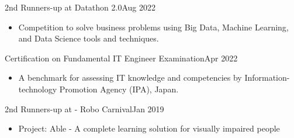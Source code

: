   \customSubHeadingContentStart
  
    \customSubHeading
      {2nd Runners-up at Datathon 2.0}{Aug 2022}
      \begin{itemize}[itemsep=-3pt, left=0pt]
        \item {Competition to solve business problems using Big Data, Machine Learning, and Data Science tools and techniques.}
    \end{itemize}
    \vspace{-10pt}
      
      
    \customSubHeading
      {Certification on Fundamental IT Engineer Examination}{Apr 2022}
     \begin{itemize}[itemsep=-3pt, left=0pt]
        \item{ A benchmark for assessing IT knowledge and competencies by Information-technology Promotion Agency (IPA), Japan.}
    \end{itemize}
    \vspace{-10pt}

    \customSubHeading
      {2nd Runners-up at - Robo Carnival}{Jan 2019}
    \begin{itemize}[itemsep=-3pt, left=0pt]
        \item{Project: Able - A complete learning solution for visually impaired people }
    \end{itemize}
    \vspace{-10pt}

  \customSubHeadingContentEnd
\vspace{-6pt}